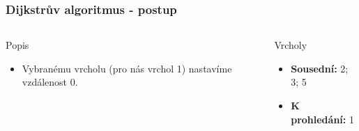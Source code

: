 \documentclass{beamer}
\begin{document}
\begin{frame}
    \frametitle{Dijkstrův algoritmus - postup}
    \begin{columns}
        \begin{block}{Popis}
            \begin{itemize}
                \item Vybranému vrcholu (pro nás vrchol 1) nastavíme vzdálenost 0.
            \end{itemize}
        \end{block}
        \begin{block}{Vrcholy}
            \begin{itemize}
                \item \textbf{Sousední:} 2; 3; 5 
                \item \textbf{K prohledání:} 1
            \end{itemize}
        \end{block}
    \end{columns}
\end{frame}
\end{document}
